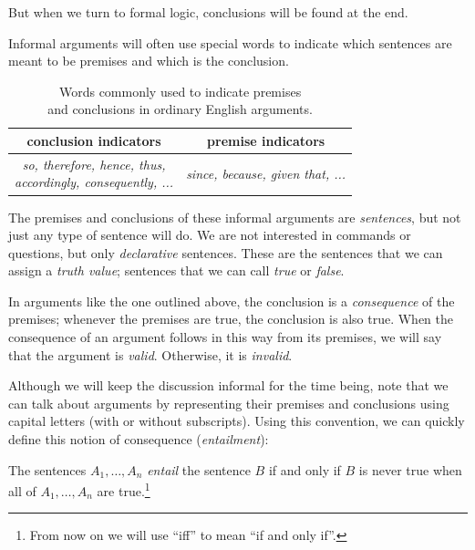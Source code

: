 But when we turn to formal logic, conclusions will be found at the end.

Informal arguments will often use special words to indicate which sentences
are meant to be premises and which is the conclusion. \\ 

\begin{table}[h]
  \begin{center}
    \begin{tabular}{|c|c|}
      \hline
      \textbf{conclusion indicators} & \textbf{premise indicators} \\
      \hline
      \makecell{ \emph{so, therefore, hence, thus,} \\
        \emph{accordingly, consequently, ... } } &
      \emph{since, because, given that, ... } \\
      \hline
    \end{tabular}
    \label{tab:indicator-words}
  \end{center}
  \captionsetup{justification=centering}
  \caption{Words commonly used to indicate premises \\
    and conclusions in ordinary English arguments.}
\end{table}

The premises and conclusions of these informal arguments are \emph{sentences},
but not just any type of sentence will do. We are not interested in commands or
questions, but only \emph{declarative} sentences. These are the sentences that
we can assign a \emph{truth value}; sentences that we can call \emph{true}
or \emph{false}.

In arguments like the one outlined above, the conclusion is a \emph{consequence}
of the premises; whenever the premises are true, the conclusion is also true.
When the consequence of an argument follows in this way from its premises, we
will say that the argument is \emph{valid}. Otherwise, it is \emph{invalid}.

Although we will keep the discussion informal for the time being, note that we
can talk about arguments by representing their premises and conclusions using
capital letters (with or without subscripts). Using this convention, we can
quickly define this notion of consequence (\emph{entailment}):

\begin{definition}
  \label{def:informal-entailment}
  The sentences $A_1,\dots,A_n$ \emph{entail} the sentence $B$ if and
  only if $B$ is never true when all of $A_1,\dots,A_n$ are true.\footnote{
  From now on we will use ``iff'' to mean ``if and only if''.}
\end{definition}


